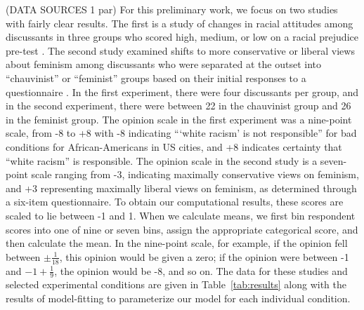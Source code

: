 \documentclass[a4paper,12pt]{article}
\begin{document}
(DATA SOURCES 1 par) For this preliminary work, we focus on two studies with
fairly clear results. The first is a study of changes in racial attitudes among
discussants in three groups who scored high, medium, or low on a racial prejudice
pre-test \cite{Myers1970}. The second study examined shifts to more conservative
or liberal views about feminism among discussants who were separated at the outset 
into ``chauvinist'' or ``feminist'' groups based on their initial responses to
a questionnaire \cite{Myers1975a}. In the first experiment, there were four
discussants per group, and in the second experiment, there were between 22 
in the chauvinist group and 26 in the feminist group. The opinion scale in 
the first experiment was a nine-point scale, from -8 to +8 with -8 indicating 
```white racism' is not responsible'' for bad conditions for African-Americans
in US cities, and +8 indicates certainty that ``white racism'' is responsible.
The opinion scale in the second study is a seven-point scale ranging from -3,
indicating maximally conservative views on feminism, and +3 representing
maximally liberal views on feminism, as determined through a six-item
questionnaire. To obtain our computational results, these scores are scaled to
lie between -1 and 1. When we calculate means, we first bin respondent scores
into one of nine or seven bins, assign the appropriate categorical score, 
and then calculate the mean. In the nine-point scale, for example, if the
opinion fell between $\pm \frac{1}{18}$, this opinion would be given a zero;
if the opinion were between -1 and $-1 + \frac{1}{9}$, the opinion would be
-8, and so on. The data for these studies and selected experimental conditions
are given in Table~\ref{tab:results} along with the results of model-fitting
to parameterize our model for each individual condition.
\end{document}
